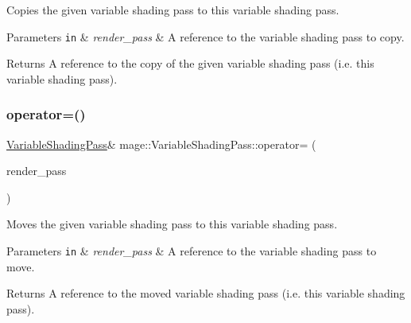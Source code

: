 Copies the given variable shading pass to this variable shading pass.


\begin{DoxyParams}[1]{Parameters}
\mbox{\tt in}  & {\em render\+\_\+pass} & A reference to the variable shading pass to copy. \\
\hline
\end{DoxyParams}
\begin{DoxyReturn}{Returns}
A reference to the copy of the given variable shading pass (i.\+e. this variable shading pass). 
\end{DoxyReturn}
\hypertarget{classmage_1_1_variable_shading_pass_a28702f255ccbbabd4b6e3177acd97a8b}{}\label{classmage_1_1_variable_shading_pass_a28702f255ccbbabd4b6e3177acd97a8b} 
\subsubsection{\texorpdfstring{operator=()}{operator=()}\hspace{0.1cm}{\footnotesize\ttfamily [2/2]}}
{\footnotesize\ttfamily \hyperlink{classmage_1_1_variable_shading_pass}{Variable\+Shading\+Pass}\& mage\+::\+Variable\+Shading\+Pass\+::operator= (\begin{DoxyParamCaption}\item[{\hyperlink{classmage_1_1_variable_shading_pass}{Variable\+Shading\+Pass} \&\&}]{render\+\_\+pass }\end{DoxyParamCaption})\hspace{0.3cm}{\ttfamily [delete]}}

Moves the given variable shading pass to this variable shading pass.


\begin{DoxyParams}[1]{Parameters}
\mbox{\tt in}  & {\em render\+\_\+pass} & A reference to the variable shading pass to move. \\
\hline
\end{DoxyParams}
\begin{DoxyReturn}{Returns}
A reference to the moved variable shading pass (i.\+e. this variable shading pass). 
\end{DoxyReturn}
\hypertarget{classmage_1_1_variable_shading_pass_a559c5c05f9e2a9e79f86a8e80e30606d}{}\label{classmage_1_1_variable_shading_pass_a559c5c05f9e2a9e79f86a8e80e30606d} 
